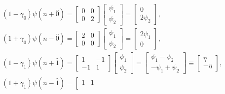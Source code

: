 \begin{equation*}
    \begin{aligned}
        & \left(1-\gamma_0\right) \psi(n+\hat 0)=\left[\begin{array}{ll}
        0 & 0 \\
        0 & 2
        \end{array}\right]\left[\begin{array}{l}
        \psi_1 \\
        \psi_2
        \end{array}\right]=\left[\begin{array}{c}
        0 \\
        2 \psi_2
        \end{array}\right], \\
        & \left(1+\gamma_0\right) \psi(n-\hat 0)=\left[\begin{array}{ll}
        2 & 0 \\
        0 & 0
        \end{array}\right]\left[\begin{array}{l}
        \psi_1 \\
        \psi_2
        \end{array}\right]=\left[\begin{array}{c}
        2 \psi_1 \\
        0
        \end{array}\right], \\
        & \left(1-\gamma_1\right) \psi(n+\hat 1)=\left[\begin{array}{cc}
        1 & -1 \\
        -1 & 1
        \end{array}\right]\left[\begin{array}{l}
        \psi_1 \\
        \psi_2
        \end{array}\right]=\left[\begin{array}{c}
        \psi_1-\psi_2 \\
        -\psi_1+\psi_2
        \end{array}\right] \equiv\left[\begin{array}{c}
        \eta \\
        -\eta
        \end{array}\right], \\
        & \left(1+\gamma_1\right) \psi(n-\hat 1)=\left[\begin{array}{ll}
        1 & 1 \\

\end{array}
\end{aligned}
\end{equation*}
